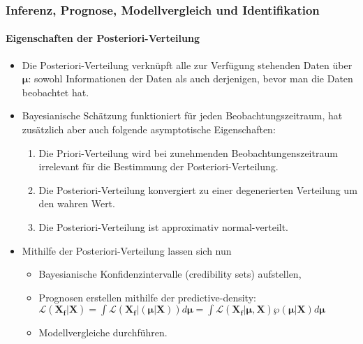 \documentclass{beamer} %
\begin{document}
\begin{frame}\frametitle{Inferenz, Prognose, Modellvergleich und Identifikation}\framesubtitle{Eigenschaften der Posteriori-Verteilung}
\begin{itemize}
  \item Die Posteriori-Verteilung verknüpft alle zur Verfügung stehenden Daten über $\mathbf{\mu}$: sowohl Informationen der Daten als auch derjenigen, bevor man die Daten beobachtet hat.
  \item Bayesianische Schätzung funktioniert für jeden Beobachtungszeitraum, hat zusätzlich aber auch folgende asymptotische Eigenschaften:
    \begin{enumerate}
      \item Die Priori-Verteilung wird bei zunehmenden Beobachtungenszeitraum irrelevant für die Bestimmung der Posteriori-Verteilung.
      \item Die Posteriori-Verteilung konvergiert zu einer degenerierten Verteilung um den wahren Wert.
      \item Die Posteriori-Verteilung ist approximativ normal-verteilt.
    \end{enumerate}
  \item Mithilfe der Posteriori-Verteilung lassen sich nun
  \begin{itemize}
  \item Bayesianische Konfidenzintervalle (credibility sets) aufstellen,
  \item Prognosen erstellen mithilfe der predictive-density: $\mathcal{L}(\mathbf{X_f}|\mathbf{X})= \int \mathcal{L}(\mathbf{X_f}|(\boldsymbol{\mu}|\mathbf{X}))d \boldsymbol{\mu} = \int \mathcal{L}(\mathbf{X_f}|\boldsymbol{\mu},\mathbf{X})\wp(\boldsymbol{\mu}|\mathbf{X})d\boldsymbol{\mu}$
  \item Modellvergleiche durchführen.
\end{itemize}
\end{itemize}
\end{frame}
\end{document}
